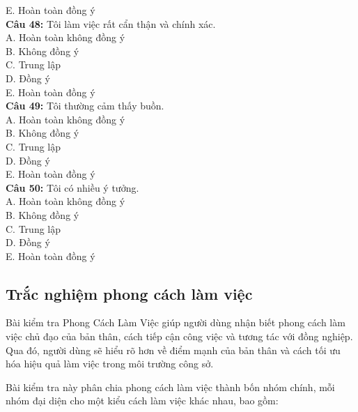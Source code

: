 \begin{multicols}{2}
E. Hoàn toàn đồng ý \\
\textbf{Câu 48:} Tôi làm việc rất cẩn thận và chính xác. \\
A. Hoàn toàn không đồng ý \\
B. Không đồng ý \\
C. Trung lập \\
D. Đồng ý \\
E. Hoàn toàn đồng ý \\
\textbf{Câu 49:} Tôi thường cảm thấy buồn. \\
A. Hoàn toàn không đồng ý \\
B. Không đồng ý \\
C. Trung lập \\
D. Đồng ý \\
E. Hoàn toàn đồng ý \\
\textbf{Câu 50:} Tôi có nhiều ý tưởng. \\
A. Hoàn toàn không đồng ý \\
B. Không đồng ý \\
C. Trung lập \\
D. Đồng ý \\
E. Hoàn toàn đồng ý \\
\end{multicols}

\subsection{Trắc nghiệm phong cách làm việc}

Bài kiểm tra Phong Cách Làm Việc giúp người dùng nhận biết phong cách làm việc chủ đạo của bản thân, cách tiếp cận công việc và tương tác với đồng nghiệp. Qua đó, người dùng sẽ hiểu rõ hơn về điểm mạnh của bản thân và cách tối ưu hóa hiệu quả làm việc trong môi trường công sở.

Bài kiểm tra này phân chia phong cách làm việc thành bốn nhóm chính, mỗi nhóm đại diện cho một kiểu cách làm việc khác nhau, bao gồm:


